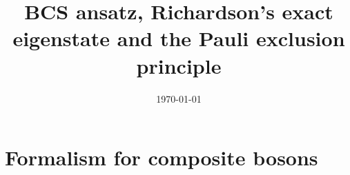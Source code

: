 \documentclass[aps,prb,preprint,groupedaddress,amsmath]{revtex4-1}
\begin{document}

\title{BCS ansatz, Richardson's exact eigenstate and the Pauli exclusion principle}


\author{}
\affiliation{}


\date{\today}

\begin{abstract}
\end{abstract}

\pacs{}

\maketitle

\section{Formalism for composite bosons\label{sec:formalism}}
\end{document}
